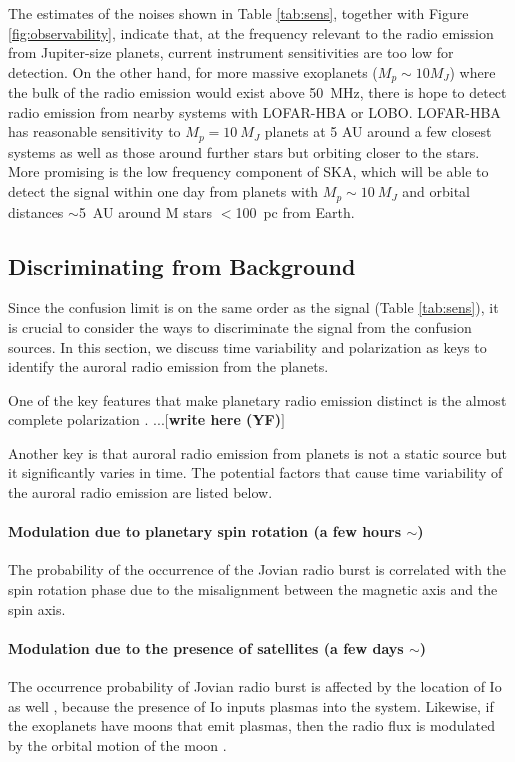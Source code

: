 \documentclass[iop,numberedappendix,apj]{emulateapj}
\def\memoYF#1{\color{red}$[${\bf #1}$]$ \color{black}}
\begin{document}
The estimates of the noises shown in Table \ref{tab:sens}, together with Figure \ref{fig:observability}, indicate that, at the frequency relevant to the radio emission from Jupiter-size planets, current instrument sensitivities are too low for detection.
On the other hand, for more massive exoplanets ($M_p\sim 10 M_J$) where the bulk of the radio emission would exist above 50~MHz, there is hope to detect radio emission from nearby systems with LOFAR-HBA or LOBO.
LOFAR-HBA has reasonable sensitivity to $M_p =10~M_J$ planets at 5 AU around a few closest systems as well as those around further stars but orbiting closer to the stars. 
More promising is the low frequency component of SKA, which will be able to detect the signal within one day from planets with $M_p \sim 10~M_J$ and orbital distances $\sim$5~AU around M stars $<$100~pc from Earth.




\subsection{Discriminating from Background}
\label{ss:timevariability}


Since the confusion limit is on the same order as the signal (Table \ref{tab:sens}), it is crucial to consider the ways to discriminate the signal from the confusion sources. In this section, we discuss time variability and polarization as keys to identify the auroral radio emission from the planets. 

One of the key features that make planetary radio emission distinct is the almost complete polarization \citep[e.g.][]{dulk1994}.
...\memoYF{write here (YF)}

Another key is that auroral radio emission from planets is not a static source but it significantly varies in time. 
The potential factors that cause time variability of the auroral radio emission are  listed below. 

\paragraph{Modulation due to planetary spin rotation (a few hours $\sim $)}
The probability of the occurrence of the Jovian radio burst is correlated with the spin rotation phase \citep{dessler1983} due to the misalignment between the magnetic axis and the spin axis. 
%
\paragraph{Modulation due to the presence of satellites (a few days $\sim $)}
The occurrence probability of Jovian radio burst is affected by the location of Io as well \citep{dessler1983}, because the presence of Io inputs plasmas into the system. 
Likewise, if the exoplanets have moons that emit plasmas, then the radio flux is  modulated by the orbital motion of the moon \citep[see e.g.,][]{noyola2014}. 
\end{document}
